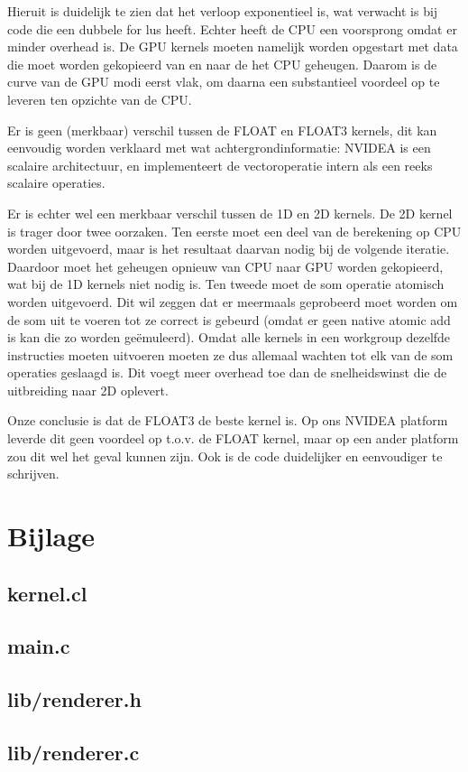 \documentclass[a4paper]{article}
\begin{document}
Hieruit is duidelijk te zien dat het verloop exponentieel is, wat verwacht is bij code die een dubbele for lus heeft. Echter heeft de CPU een voorsprong omdat er minder overhead is. De GPU kernels moeten namelijk worden opgestart met data die moet worden gekopieerd van en naar de het CPU geheugen. Daarom is de curve van de GPU modi eerst vlak, om daarna een substantieel voordeel op te leveren ten opzichte van de CPU.

Er is geen (merkbaar) verschil tussen de FLOAT en FLOAT3 kernels, dit kan eenvoudig worden verklaard met wat achtergrondinformatie: NVIDEA is een scalaire architectuur, en implementeert de vectoroperatie intern als een reeks scalaire operaties.

Er is echter wel een merkbaar verschil tussen de 1D en 2D kernels. De 2D kernel is trager door twee oorzaken. Ten eerste moet een deel van de berekening op CPU worden uitgevoerd, maar is het resultaat daarvan nodig bij de volgende iteratie. Daardoor moet het geheugen opnieuw van CPU naar GPU worden gekopieerd, wat bij de 1D kernels niet nodig is.
Ten tweede moet de som operatie atomisch worden uitgevoerd. Dit wil zeggen dat er meermaals geprobeerd moet worden om de som uit te voeren tot ze correct is gebeurd (omdat er geen native atomic add is kan die zo worden geëmuleerd). Omdat alle kernels in een workgroup dezelfde instructies moeten uitvoeren moeten ze dus allemaal wachten tot elk van de som operaties geslaagd is. Dit voegt meer overhead toe dan de snelheidswinst die de uitbreiding naar 2D oplevert.

Onze conclusie is dat de FLOAT3 de beste kernel is. Op ons NVIDEA platform leverde dit geen voordeel op t.o.v. de FLOAT kernel, maar op een ander platform zou dit wel het geval kunnen zijn. Ook is de code duidelijker en eenvoudiger te schrijven.

\newpage\section{Bijlage}

\subsection{kernel.cl}\label{bijlage:kernel}


\subsection{main.c}\label{bijlage:main}


\subsection{lib/renderer.h}\label{bijlage:lib_renderer_h}


\subsection{lib/renderer.c}\label{bijlage:lib_renderer_c}

\end{document}
